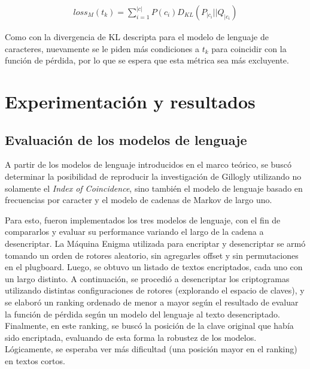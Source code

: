\documentclass[a4paper,10pt]{article}
\begin{document}
\begin{align}
    {loss_M}(t_k) = \sum_{i=1}^{|c|} P(c_i) D_{KL}(P_{|c_i}||Q_{|c_i})
\end{align}

Como con la divergencia de KL descripta para el modelo de lenguaje de caracteres, nuevamente se le piden más condiciones a $t_k$ para coincidir con la función de pérdida, por lo que se espera que esta métrica sea más excluyente.

\section{Experimentación y resultados}

\subsection{Evaluación de los modelos de lenguaje}

A partir de los modelos de lenguaje introducidos en el marco teórico, se buscó determinar la posibilidad de reproducir la investigación de Gillogly utilizando no solamente el \textit{Index of Coincidence}, sino también el modelo de lenguaje basado en frecuencias por caracter y el modelo de cadenas de Markov de largo uno.

Para esto, fueron implementados los tres modelos de lenguaje, con el fin de compararlos y evaluar su performance variando el largo de la cadena a desencriptar. La Máquina Enigma utilizada para encriptar y desencriptar se armó tomando un orden de rotores aleatorio, sin agregarles offset y sin permutaciones en el plugboard. Luego, se obtuvo un listado de textos encriptados, cada uno con un largo distinto. A continuación, se procedió a desencriptar los criptogramas utilizando distintas configuraciones de rotores (explorando el espacio de claves), y se elaboró un ranking ordenado de menor a mayor según el resultado de evaluar la función de pérdida según un modelo del lenguaje al texto desencriptado. Finalmente, en este ranking, se buscó la posición de la clave original que había sido encriptada, evaluando de esta forma la robustez de los modelos. Lógicamente, se esperaba ver más dificultad (una posición mayor en el ranking) en textos cortos.
\end{document}
